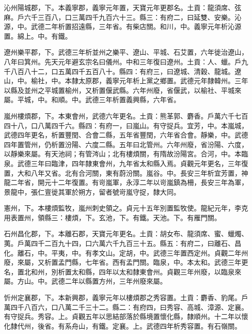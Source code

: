 \begin{pinyinscope}
 沁州陽城郡，下。本義寧郡，義寧元年置，天寶元年更郡名。土貢：龍須席、弦麻。戶六千三百八，口三萬四千九百六十三。縣三：有府二，曰延雙、安樂。沁源，中。武德二年析置招遠縣，三年省。有柴店關。和川，中。義寧元年析沁源置。綿上。中。有鐵。



 遼州樂平郡，下。武德三年析並州之樂平、遼山、平城、石艾置，六年徙治遼山，八年曰箕州。先天元年避玄宗名曰儀州。中和三年復曰遼州。土貢：人、蠟。戶九千八百八十二，口五萬四千五百八十。縣四：有府三，曰遼城、清穀、龍城。遼山，中。榆社，中。本隸太原郡，義寧元年析上黨之鄉置。武德元年隸韓州。三年以縣及並州之平城置榆州，又析置偃武縣。六年州廢，省偃武，以榆社、平城來屬。平城，中。和順。中。武德三年析置義興縣，六年省。



 嵐州樓煩郡，下。本東會州，武德六年更名。土貢：熊革郭、麝香。戶萬六千七百四十八，口八萬四千六。縣四：有府一，曰嵐山。有守捉兵。宜芳，中。本嵐城，武德四年更名，析置豐閏、合會二縣，五年省豐閏，六年省合會。靜樂，中。武德四年置管州，仍析置汾陽、六度二縣。五年曰北管州。六年州廢，省汾陽、六度，以靜樂來屬。有天池祠；有管涔山；北有樓煩關，有隋故汾陽宮。合河，中。本臨泉。武德三年曰臨津，四年隸東會州，九年省太和縣入焉。貞觀元年更名，三年復置，大和八年又省。北有合河關，東有蔚汾關。嵐谷。中。長安三年析宜芳置，神龍二年省，開元十二年復置。有岢嵐軍，永淳二年以岢嵐鎮為柵，長安三年為軍，景龍中，張仁亶徙其軍於朔方，留者號岢嵐守捉，隸大同。



 憲州，下。本樓煩監牧，嵐州刺史領之。貞元十五年別置監牧使。龍紀元年，李克用表置州，領縣三：樓煩，下。玄池，下。有鐵。天池。下。有雁門關。



 石州昌化郡，下。本離石郡，天寶元年更名。土貢：胡女布、龍須席、蜜、蠟燭、荑。戶萬四千二百九十四，口六萬六千九百三十五。縣五：有府二，曰離石、昌化。離石，中。平夷，中。有孝文山。定胡，中。武德三年置西定州。貞觀二年州廢，來屬，又析置孟門縣，七年省。西有孟門關。臨泉，中。本太和。武德三年更名，置北和州，別析置太和縣，四年以太和隸東會州。貞觀三年州廢，以臨泉來屬。方山。中。武德二年以縣置方州，三年州廢來屬。



 忻州定襄郡，下。本新興郡，義寧元年以樓煩郡之秀容置。土貢：麝香、豹尾。戶萬四千八百六，口八萬二千三十二。縣二：有府四，曰秀容、高城、漳源、定襄。有守捉兵。秀容。上。貞觀五年以思結部落於縣境置懷化縣，隸順州。十二年以懷化隸代州，後省。有系舟山，有鐵。定襄。上。武德四年析秀容置。有石嶺關。




\end{pinyinscope}
